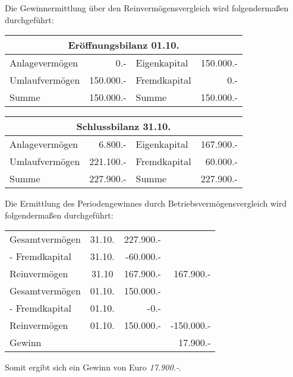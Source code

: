 \documentclass[parskip=half,12pt,a4paper]{scrartcl}
\begin{document}
Die Gewinnermittlung über den Reinvermögensvergleich wird folgendermaßen durchgeführt:

\begin{center}
	\begin{tabular}{lr|lr}
		\multicolumn{4}{c}{Eröffnungsbilanz 01.10.}\\
		\toprule
		Anlagevermögen & 0.- & Eigenkapital & 150.000.-\\
		Umlaufvermögen & 150.000.- & Fremdkapital & 0.-\\
		\bottomrule
		Summe & 150.000.- & Summe & 150.000.-\\
	\end{tabular}
\end{center}

\begin{center}
	\begin{tabular}{lr|lr}
		\multicolumn{4}{c}{Schlussbilanz 31.10.}\\
		\toprule
		Anlagevermögen & 6.800.- & Eigenkapital & 167.900.-\\
		Umlaufvermögen & 221.100.- & Fremdkapital & 60.000.-\\
		\bottomrule
		Summe & 227.900.- & Summe & 227.900.-\\
	\end{tabular}
\end{center}

Die Ermittlung des Periodengewinnes durch Betriebsvermögensvergleich wird folgendermaßen durchgeführt:

\begin{center}
	\begin{tabular}{lcrr}
		Gesamtvermögen & 31.10. & 227.900.- &\\
		- Fremdkapital & 31.10. & -60.000.- &\\
		\midrule
		Reinvermögen & 31.10 & 167.900.-& 167.900.-\\		
		Gesamtvermögen & 01.10. & 150.000.- &\\
		- Fremdkapital & 01.10. & -0.- &\\
		\midrule
		Reinvermögen & 01.10. & 150.000.- & -150.000.-\\
		\midrule
		Gewinn & & & 17.900.-\\
		\bottomrule
	\end{tabular}
\end{center}

Somit ergibt sich ein Gewinn von Euro \emph{17.900.-}.
\end{document}
